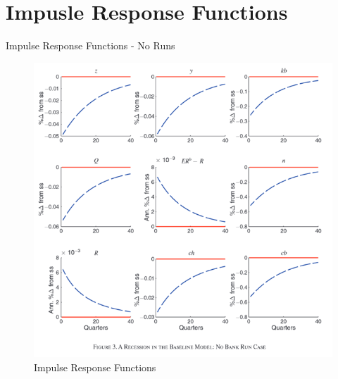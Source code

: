 \documentclass[
	11pt, %
	aspectratio=169, %
]{beamer}
\begin{document}
\section{Impusle Response Functions}
\begin{frame}{Impulse Response Functions - No Runs}
    \begin{figure}
        \centering
        \includegraphics[scale=0.4]{no_run_case.png}
        \caption{Impulse Response Functions}
        \label{fig:irf}
    \end{figure}
\end{frame}
\end{document}

